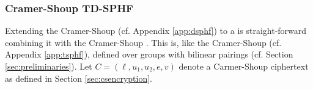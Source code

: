 \subsubsection{Cramer-Shoup TD-SPHF}\label{sec:cs-tdsphf}
Extending the Cramer-Shoup \DSPHF (cf. Appendix \ref{app:dsphf}) to a \TDSPHF is straight-forward combining it with the Cramer-Shoup \TSPHF.
This \TDSPHF is, like the Cramer-Shoup \TSPHF (cf. Appendix \ref{app:tsphf}), defined over groups with bilinear pairings (cf. Section \ref{sec:preliminaries}).
Let $C=(\ell, u_1, u_2, e, v)$ denote a Carmer-Shoup ciphertext as defined in Section \ref{sec:csencryption}.


